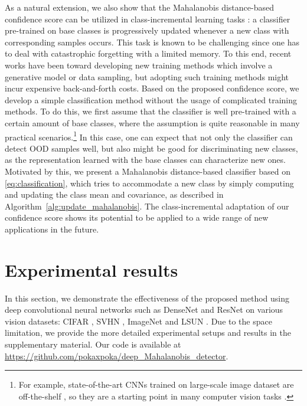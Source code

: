 \documentclass{article}
\begin{document}
{
As a natural extension, we also show that the Mahalanobis distance-based confidence score can be utilized in class-incremental learning tasks \citep{rebuffi2017icarl}:
a classifier pre-trained on base classes is progressively updated whenever a new class with corresponding samples occurs.
This task is known to be challenging since one has to deal with catastrophic forgetting \citep{mccloskey1989catastrophic} with a limited memory.
To this end, recent works have been toward developing new training methods which involve a generative model or data sampling, but adopting such training
methods might incur expensive back-and-forth costs.
Based on the proposed confidence score, we develop a simple classification method without the usage of complicated training methods.
To do this, we first assume that the classifier is well pre-trained with a certain amount of base classes, where
the assumption is quite reasonable in many practical scenarios.\footnote{For example, state-of-the-art CNNs trained on large-scale image dataset are off-the-shelf \citep{he2016deep, huang2017densely}, so they are a starting point in many computer vision tasks \citep{girshick2015fast, lee2018hierarchical, mensink2013distance}.}
In this case, one can expect that not only the classifier can detect OOD samples well, but also might be good for discriminating new classes, as the representation learned with the base classes can characterize new ones.
Motivated by this, 
we present a Mahalanobis distance-based classifier based on \eqref{eq:classification},
which tries to accommodate a new class by simply computing and updating the class mean and covariance, as described in Algorithm~\ref{alg:update_mahalanobis}.}
The class-incremental adaptation of our confidence score shows its potential to be applied to a wide range of new applications in the future.






\section{Experimental results} \label{sec:exp}


In this section, we demonstrate the effectiveness of the proposed method using deep convolutional neural networks such as DenseNet \citep{huang2017densely} and ResNet \citep{he2016deep} on various vision datasets: CIFAR \citep{krizhevsky2009learning}, SVHN \citep{netzer2011reading}, ImageNet \citep{deng2009imagenet} and LSUN \citep{yu2015lsun}.
Due to the space limitation, we provide the more detailed experimental setups and results in the supplementary material. Our code is available at \url{https://github.com/pokaxpoka/deep_Mahalanobis_detector}.
\end{document}
